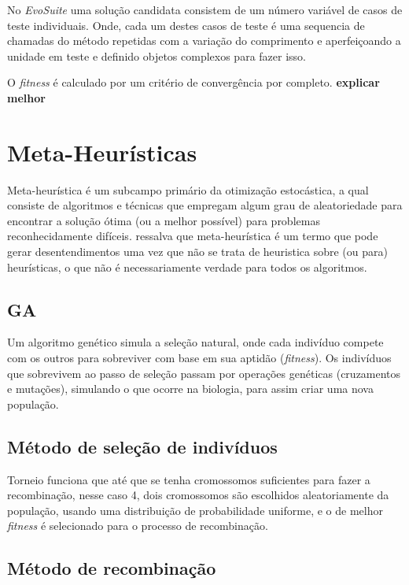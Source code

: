 \documentclass[12pt,a4paper]{article}
\begin{document}
No \textit{EvoSuite} uma solução candidata consistem de um número variável de casos de teste individuais. Onde, cada um destes casos de teste é uma sequencia de chamadas do método repetidas
com a variação do comprimento e aperfeiçoando a unidade em teste e definido objetos complexos para fazer isso.  

O \textit{fitness} é calculado por um critério de convergência por completo. \textbf{explicar melhor} 



\newpage

\section{Meta-Heurísticas}
Meta-heurística é um subcampo primário da otimização estocástica, a qual consiste de algoritmos e técnicas que empregam algum grau de aleatoriedade para encontrar a solução ótima (ou a melhor possível) para problemas reconhecidamente difíceis. \citeauthor{luke2009essentials} \cite{luke2009essentials} ressalva que meta-heurística é um termo que pode gerar desentendimentos uma vez que não se trata de heuristica sobre (ou para) heurísticas, o que não é necessariamente verdade para todos os algoritmos. 

\subsection{GA}
\label{sec:alg_genetic}

Um algoritmo genético simula a seleção natural, onde cada indivíduo compete com os outros para sobreviver com base em sua aptidão (\emph{fitness}). Os indivíduos que sobrevivem ao passo de
seleção passam por operações genéticas (cruzamentos e mutações), simulando o que ocorre na biologia, para assim criar uma nova população.

    \subsection{Método de seleção de indivíduos}

        Torneio funciona que até que se tenha cromossomos suficientes para fazer a recombinação, nesse caso 4, dois cromossomos são escolhidos aleatoriamente da população, usando uma distribuição de
        probabilidade uniforme, e o de melhor \textit{fitness} é selecionado para o processo de recombinação.

    \subsection{Método de recombinação}
\end{document}
